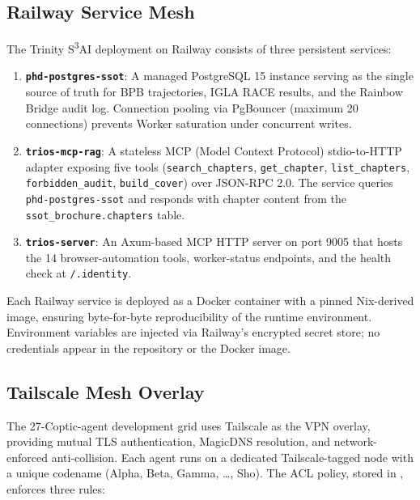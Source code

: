 \subsection{Railway Service Mesh}\label{fa_22:subsec:railway-mesh}

The Trinity S\textsuperscript{3}AI deployment on Railway consists of three persistent services:

\begin{enumerate}
\item \textbf{\texttt{phd-postgres-ssot}}: A managed PostgreSQL 15 instance serving as the single source of truth for BPB trajectories, IGLA RACE results, and the Rainbow Bridge audit log. Connection pooling via PgBouncer (maximum 20 connections) prevents Worker saturation under concurrent writes.

\item \textbf{\texttt{trios-mcp-rag}}: A stateless MCP (Model Context Protocol) stdio-to-HTTP adapter exposing five tools (\texttt{search\_chapters}, \texttt{get\_chapter}, \texttt{list\_chapters}, \texttt{forbidden\_audit}, \texttt{build\_cover}) over JSON-RPC 2.0. The service queries \texttt{phd-postgres-ssot} and responds with chapter content from the \texttt{ssot\_brochure.chapters} table.

\item \textbf{\texttt{trios-server}}: An Axum-based MCP HTTP server on port 9005 that hosts the 14 browser-automation tools, worker-status endpoints, and the health check at \texttt{/.identity}.
\end{enumerate}

Each Railway service is deployed as a Docker container with a pinned Nix-derived image, ensuring byte-for-byte reproducibility of the runtime environment. Environment variables are injected via Railway's encrypted secret store; no credentials appear in the repository or the Docker image.

\subsection{Tailscale Mesh Overlay}\label{fa_22:subsec:tailscale-mesh}

The 27-Coptic-agent development grid uses Tailscale as the VPN overlay, providing mutual TLS authentication, MagicDNS resolution, and network-enforced anti-collision. Each agent runs on a dedicated Tailscale-tagged node with a unique codename (Alpha, Beta, Gamma, \ldots, Sho). The ACL policy, stored in , enforces three rules:

